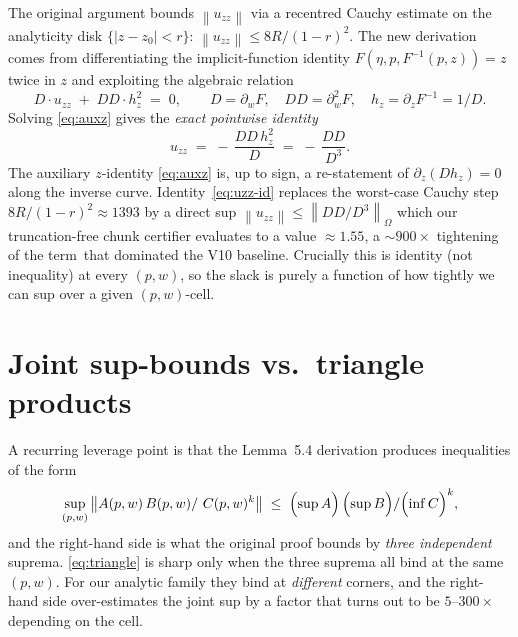\documentclass[11pt]{article}
\theoremstyle{definition}
\newcommand{\Fmap}{F}
\newcommand{\Finvmap}{F^{-1}}
\newcommand{\Om}{\Omega}
\newcommand{\norm}[1]{\left\lVert#1\right\rVert}
\begin{document}
The original argument bounds $\norm{u_{zz}}$ via a recentred Cauchy estimate on the
analyticity disk $\{|z-z_0|<r\}$:
\(
   \norm{u_{zz}}\le 8R/(1-r)^2.
\)
The new derivation comes from differentiating the implicit-function identity
$\Fmap(\eta, p, \Finvmap(p,z)) = z$ twice in $z$ and exploiting the algebraic relation
\begin{equation}\label{eq:auxz}
   D\cdot u_{zz}
   \;+\;
   DD\cdot h_z^2
   \;=\; 0,
   \qquad
   D = \partial_w \Fmap,\quad
   DD = \partial_w^2 \Fmap,\quad
   h_z = \partial_z\Finvmap = 1/D.
\end{equation}
Solving \eqref{eq:auxz} gives the \emph{exact pointwise identity}
\begin{equation}\label{eq:uzz-id}
   u_{zz}
   \;=\;
   -\,\frac{DD\,h_z^2}{D}
   \;=\;
   -\,\frac{DD}{D^3}.
\end{equation}
The auxiliary $z$-identity \eqref{eq:auxz} is, up to sign, a re-statement of
$\partial_z(D h_z) = 0$ along the inverse curve.
Identity~\eqref{eq:uzz-id} replaces the worst-case Cauchy step
$8R/(1-r)^2 \approx 1393$ by a direct sup
\(
   \norm{u_{zz}}\le \norm{DD/D^3}_{\Om}
\)
which our truncation-free chunk certifier evaluates to a value $\approx 1.55$,
a $\sim 900\times$ tightening of the term~that dominated the V10 baseline.
Crucially this is identity (not inequality) at every $(p,w)$, so the slack is purely a
function of how tightly we can sup over a given $(p,w)$-cell.

\bigskip

\section{Joint sup-bounds vs.\ triangle products}\label{sec:joint-vs-triangle}

A recurring leverage point is that the Lemma~5.4 derivation produces inequalities of
the form
\begin{equation}\label{eq:triangle}
   \sup_{(p,w)} \norm{ A(p,w)\,B(p,w) /\ C(p,w)^k }
   \;\le\;
   \Bigl(\sup A\Bigr)\,\Bigl(\sup B\Bigr) / \Bigl(\inf C\Bigr)^k,
\end{equation}
and the right-hand side is what the original proof bounds by \emph{three independent}
suprema. \eqref{eq:triangle} is sharp only when the three suprema all bind at the same
$(p,w)$. For our analytic family they bind at \emph{different} corners, and the
right-hand side over-estimates the joint sup by a factor that turns out to be
$5$--$300\times$ depending on the cell.
\end{document}
